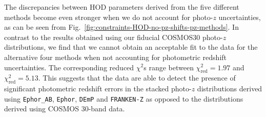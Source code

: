 \documentclass[a4paper,11pt]{article}
\begin{document}
      The discrepancies between HOD parameters derived from the five different methods become even stronger when we do not account for photo-$z$ uncertainties, as can be seen from Fig.~\ref{fig:constraints-HOD-no-pz-shifts-pz-methods}. In contrast to the results obtained using our fiducial COSMOS30 photo-$z$ distributions, we find that we cannot obtain an acceptable fit to the data for the alternative four methods when not accounting for photometric redshift uncertainties. The corresponding reduced $\chi^{2}$s range between $\chi^{2}_{\mathrm{red}} = 1.97$ and $\chi^{2}_{\mathrm{red}} = 5.13$. This suggests that the data are able to detect the presence of significant photometric redshift errors in the stacked photo-$z$ distributions derived using \texttt{Ephor\_AB}, \texttt{Ephor}, \texttt{DEmP} and \texttt{FRANKEN-Z} as opposed to the distributions derived using COSMOS 30-band data.
\end{document}
